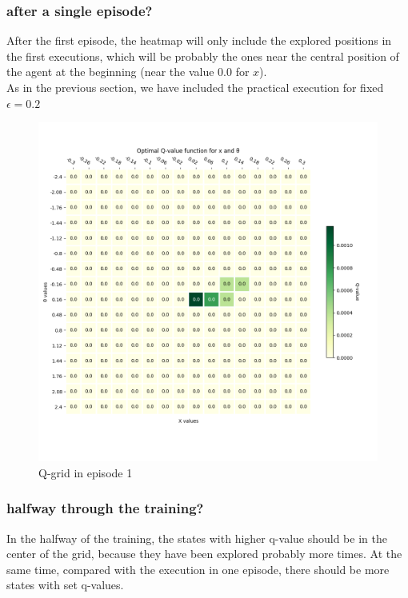\documentclass[12pt]{article}
\begin{document}
\subsubsection{after a single episode?}

After the first episode, the heatmap will only include the explored positions in the first executions, which will be probably the ones near the central position of the agent at the beginning (near the value 0.0 for $x$).\\

As in the previous section, we have included the practical execution for fixed $\epsilon=0.2$

\begin{figure}[h]
    \centering
    \includegraphics[scale=0.25]{exercise-3/plots/heatmap-fixed-0.2-ep-1.png}
    \caption{Q-grid in episode 1}
    \label{fig:q-1-2}
\end{figure}

\subsubsection{halfway through the training?}

In the halfway of the training, the states with higher q-value should be in the center of the grid, because they have been explored probably more times. At the same time, compared with the execution in one episode, there should be more states with set q-values.\\
\end{document}
